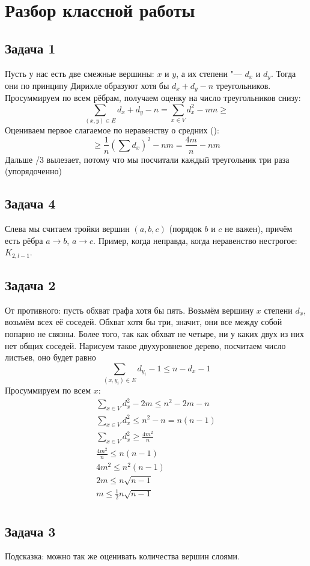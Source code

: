 \section{Разбор классной работы}
\subsection{Задача 1}
	Пусть у нас есть две смежные вершины: $x$ и $y$, а их степени "--- $d_x$ и $d_y$.
	Тогда они по принципу Дирихле образуют хотя бы $d_x + d_y - n$ треугольников.
	Просуммируем по всем рёбрам, получаем оценку на число треугольников снизу:
	\[
		\sum_{(x,y)\in E} d_x + d_y - n = \sum_{x \in V} d_x^2 - nm \ge
	\]
	Оцениваем первое слагаемое по неравенству о средних (\TODO):
	\[
		\ge \frac{1}{n} \left(\sum d_x \right)^2 - nm =
		\frac{4m}{n} - nm
	\]
	Дальше /3 вылезает, потому что мы посчитали каждый треугольник три раза (упорядоченно)

\subsection{Задача 4}
	Слева мы считаем тройки вершин $(a, b, c)$ (порядок $b$ и $c$ не важен), причём есть рёбра $a \to b$, $a \to c$.
	\TODO
	Пример, когда неправда, когда неравенство нестрогое: $K_{2,l-1}$.

\subsection{Задача 2}
	От противного: пусть обхват графа хотя бы пять.
	Возьмём вершину $x$ степени $d_x$, возьмём всех её соседей.
	Обхват хотя бы три, значит, они все между собой попарно не связны.
	Более того, так как обхват не четыре, ни у каких двух из них нет общих соседей.
	Нарисуем такое двухуровневое дерево, посчитаем число листьев, оно будет равно
	\[ \sum_{(x, y_i) \in E} d_{y_i}-1 \le n - d_x - 1 \] %
	Просуммируем по всем $x$:
	\begin{gather*}
		\sum_{x \in V} d_x^2 - 2m \le n^2 - 2m - n \\
		\sum_{x \in V} d_x^2 \le n^2 - n = n(n-1) \\
		\sum_{x \in V} d_x^2 \ge \frac{4m^2}{n} \\
		\frac{4m^2}{n} \le n(n-1) \\
		4m^2 \le n^2(n-1) \\
		2m \le n\sqrt{n-1} \\
		m \le \frac12 n\sqrt{n-1} \\
	\end{gather*}

\subsection{Задача 3}
	Подсказка: можно так же оценивать количества вершин слоями.
